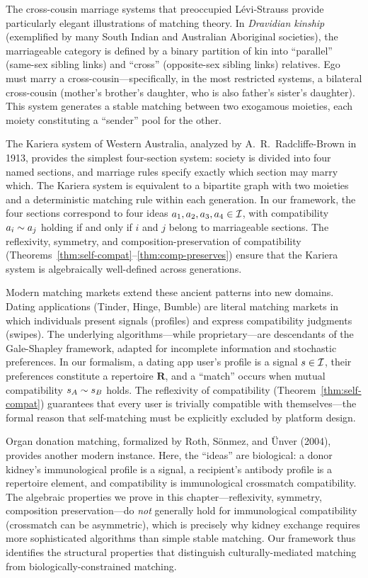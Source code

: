 The cross-cousin marriage systems that preoccupied Lévi-Strauss provide
particularly elegant illustrations of matching theory.  In \emph{Dravidian
kinship} (exemplified by many South Indian and Australian Aboriginal
societies), the marriageable category is defined by a binary partition of
kin into ``parallel'' (same-sex sibling links) and ``cross'' (opposite-sex
sibling links) relatives.  Ego must marry a cross-cousin---specifically,
in the most restricted systems, a bilateral cross-cousin (mother's
brother's daughter, who is also father's sister's daughter).  This system
generates a stable matching between two exogamous moieties, each moiety
constituting a ``sender'' pool for the other.

The Kariera system of Western Australia, analyzed by A.\ R.\
Radcliffe-Brown in 1913, provides the simplest four-section system:
society is divided into four named sections, and marriage rules specify
exactly which section may marry which.  The Kariera system is equivalent
to a bipartite graph with two moieties and a deterministic matching rule
within each generation.  In our framework, the four sections correspond
to four ideas $a_1, a_2, a_3, a_4 \in \mathcal{I}$, with compatibility
$a_i \sim a_j$ holding if and only if $i$ and $j$ belong to
marriageable sections.  The reflexivity, symmetry, and composition-preservation
of compatibility (Theorems~\ref{thm:self-compat}--\ref{thm:comp-preserves})
ensure that the Kariera system is algebraically well-defined across
generations.

Modern matching markets extend these ancient patterns into new domains.
Dating applications (Tinder, Hinge, Bumble) are literal matching markets
in which individuals present signals (profiles) and express compatibility
judgments (swipes).  The underlying algorithms---while proprietary---are
descendants of the Gale-Shapley framework, adapted for incomplete
information and stochastic preferences.  In our formalism, a dating app
user's profile is a signal $s \in \mathcal{I}$, their preferences constitute a
repertoire $\mathbf{R}$, and a ``match'' occurs when mutual compatibility
$s_A \sim s_B$ holds.  The reflexivity of compatibility
(Theorem~\ref{thm:self-compat}) guarantees that every user is trivially
compatible with themselves---the formal reason that self-matching must be
explicitly excluded by platform design.

Organ donation matching, formalized by Roth, Sönmez, and Ünver (2004),
provides another modern instance.  Here, the ``ideas'' are biological: a
donor kidney's immunological profile is a signal, a recipient's antibody
profile is a repertoire element, and compatibility is immunological
crossmatch compatibility.  The algebraic properties we prove in this
chapter---reflexivity, symmetry, composition preservation---do \emph{not}
generally hold for immunological compatibility (crossmatch can be
asymmetric), which is precisely why kidney exchange requires more
sophisticated algorithms than simple stable matching.  Our framework thus
identifies the structural properties that distinguish culturally-mediated
matching from biologically-constrained matching.

